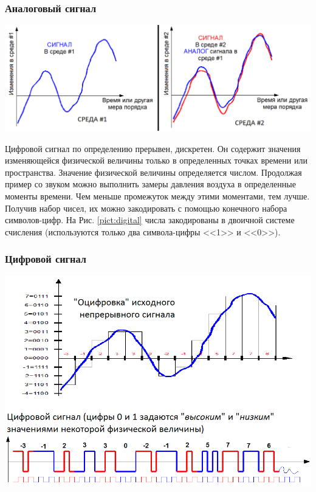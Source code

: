 \begin{frame}
    \frametitle{Аналоговый сигнал}
    
    \begin{center}
        \includegraphics[width=\textwidth]{fig/analog} 
    \end{center}
\end{frame}


Цифровой сигнал по определению прерывен, дискретен. Он содержит значения изменяющейся физической величины только в определенных точках времени или пространства. Значение физической величины определяется числом. Продолжая пример со звуком можно выполнить замеры давления воздуха в определенные моменты времени. Чем меньше промежуток между этими моментами, тем лучше. Получив набор чисел, их можно закодировать с помощью конечного набора символов-цифр. На Рис. \ref{pict:digital} числа закодированы в двоичной системе счисления (используются только два символа-цифры <<1>> и <<0>>).


\begin{frame}
    \frametitle{Цифровой сигнал}
    \begin{center}
        \includegraphics[height=.75\textheight]{fig/digital} 
    \end{center}
\end{frame}


